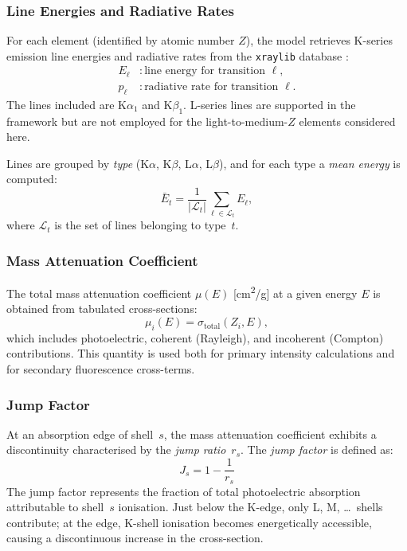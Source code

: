 \documentclass[journal,lettersize]{IEEEtran}
\begin{document}
\subsubsection{Line Energies and Radiative Rates}

For each element (identified by atomic number $Z$), the model retrieves
K-series emission line energies and radiative rates from the
\texttt{xraylib} database \cite{Schoonjans2011}:
\begin{align}
  E_\ell &: \text{line energy for transition } \ell, \label{eq:line_energy}\\
  p_\ell &: \text{radiative rate for transition } \ell. \label{eq:rad_rate}
\end{align}
The lines included are K$\alpha_1$ and K$\beta_1$.  L-series lines are
supported in the framework but are not employed for the light-to-medium-$Z$
elements considered here.

Lines are grouped by \emph{type} (K$\alpha$, K$\beta$, L$\alpha$,
L$\beta$), and for each type a \emph{mean energy} is computed:
\begin{equation}\label{eq:mean_energy}
  \bar{E}_t = \frac{1}{|\mathcal{L}_t|}
    \sum_{\ell \in \mathcal{L}_t} E_\ell,
\end{equation}
where $\mathcal{L}_t$ is the set of lines belonging to type~$t$.

\subsubsection{Mass Attenuation Coefficient}

The total mass attenuation coefficient $\mu(E)$ [\si{cm^2/g}] at a
given energy $E$ is obtained from tabulated cross-sections:
\begin{equation}\label{eq:cs_total}
  \mu_i(E) = \sigma_{\mathrm{total}}(Z_i, E),
\end{equation}
which includes photoelectric, coherent (Rayleigh), and incoherent
(Compton) contributions.  This quantity is used both for primary
intensity calculations and for secondary fluorescence cross-terms.

\subsubsection{Jump Factor}\label{sec:jump_factor}

At an absorption edge of shell~$s$, the mass attenuation coefficient
exhibits a discontinuity characterised by the \emph{jump ratio}~$r_s$.
The \emph{jump factor} is defined as:
\begin{equation}\label{eq:jump_factor}
  \boxed{J_s = 1 - \frac{1}{r_s}}
\end{equation}
The jump factor represents the fraction of total photoelectric
absorption attributable to shell~$s$ ionisation.  Just below the K-edge,
only L, M, \ldots\ shells contribute; at the edge, K-shell ionisation
becomes energetically accessible, causing a discontinuous increase in
the cross-section.
\end{document}
